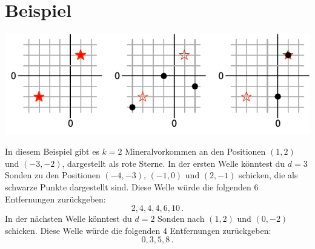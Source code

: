 \section*{Beispiel}

\includegraphics[width=.6\textwidth]{img/sample1.pdf}

In diesem Beispiel gibt es $k=2$ Mineralvorkommen an den Positionen $(1,2)$ und $(-3,-2)$, dargestellt als rote Sterne.
In der ersten Welle könntest du $d=3$ Sonden zu den Positionen $(-4,-3)$, $(-1, 0)$ und $(2,-1)$ schicken, die als schwarze Punkte dargestellt sind.
Diese Welle würde die folgenden $6$ Entfernungen zurückgeben: \[
  2, 4, 4, 4, 6, 10\,.
\]
In der nächsten Welle könntest du $d=2$ Sonden nach $(1,2)$ und $(0,-2)$ schicken.
Diese Welle würde die folgenden $4$ Entfernungen zurückgeben: \[
  0, 3, 5, 8\,.
\]
